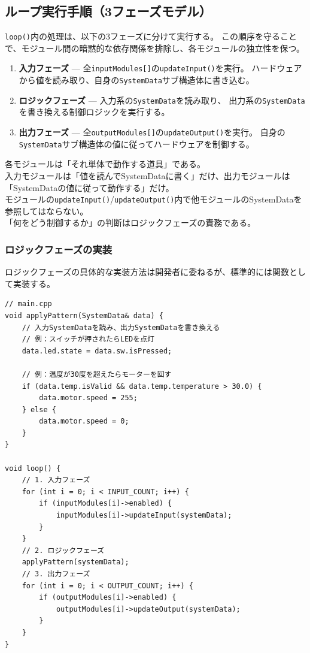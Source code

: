 \subsection{ループ実行手順（3フェーズモデル）}

\texttt{loop()}内の処理は、以下の3フェーズに分けて実行する。
この順序を守ることで、モジュール間の暗黙的な依存関係を排除し、各モジュールの独立性を保つ。

\begin{enumerate}
    \item \textbf{入力フェーズ} — 全\texttt{inputModules[]}の\texttt{updateInput()}を実行。
    ハードウェアから値を読み取り、自身の\texttt{SystemData}サブ構造体に書き込む。
    \item \textbf{ロジックフェーズ} — 入力系の\texttt{SystemData}を読み取り、
    出力系の\texttt{SystemData}を書き換える制御ロジックを実行する。
    \item \textbf{出力フェーズ} — 全\texttt{outputModules[]}の\texttt{updateOutput()}を実行。
    自身の\texttt{SystemData}サブ構造体の値に従ってハードウェアを制御する。
\end{enumerate}

\begin{notebox}[3フェーズの原則]
各モジュールは「それ単体で動作する道具」である。\\
入力モジュールは「値を読んでSystemDataに書く」だけ、出力モジュールは「SystemDataの値に従って動作する」だけ。\\
モジュールの\texttt{updateInput()}/\texttt{updateOutput()}内で他モジュールのSystemDataを参照してはならない。\\
「何をどう制御するか」の判断はロジックフェーズの責務である。
\end{notebox}

\subsubsection{ロジックフェーズの実装}

ロジックフェーズの具体的な実装方法は開発者に委ねるが、標準的には関数として実装する。

\begin{lstlisting}[style=cppstyle, caption={ロジックフェーズの標準的な実装}]
// main.cpp
void applyPattern(SystemData& data) {
    // 入力SystemDataを読み、出力SystemDataを書き換える
    // 例：スイッチが押されたらLEDを点灯
    data.led.state = data.sw.isPressed;

    // 例：温度が30度を超えたらモーターを回す
    if (data.temp.isValid && data.temp.temperature > 30.0) {
        data.motor.speed = 255;
    } else {
        data.motor.speed = 0;
    }
}

void loop() {
    // 1. 入力フェーズ
    for (int i = 0; i < INPUT_COUNT; i++) {
        if (inputModules[i]->enabled) {
            inputModules[i]->updateInput(systemData);
        }
    }
    // 2. ロジックフェーズ
    applyPattern(systemData);
    // 3. 出力フェーズ
    for (int i = 0; i < OUTPUT_COUNT; i++) {
        if (outputModules[i]->enabled) {
            outputModules[i]->updateOutput(systemData);
        }
    }
}
\end{lstlisting}

